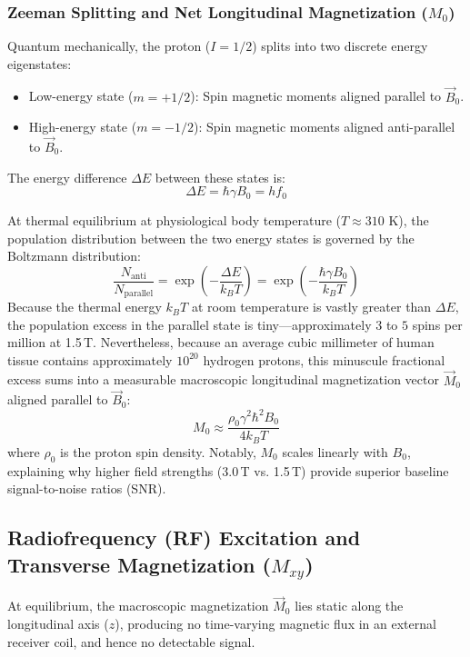 \documentclass[11pt,a4paper]{article}
\begin{document}
\subsubsection{Zeeman Splitting and Net Longitudinal Magnetization ($M_0$)}
Quantum mechanically, the proton ($I = 1/2$) splits into two discrete energy eigenstates:
\begin{itemize}
    \item Low-energy state ($m = +1/2$): Spin magnetic moments aligned parallel to $\vec{B}_0$.
    \item High-energy state ($m = -1/2$): Spin magnetic moments aligned anti-parallel to $\vec{B}_0$.
\end{itemize}
The energy difference $\Delta E$ between these states is:
\begin{equation}
    \Delta E = \hbar \gamma B_0 = h f_0
\end{equation}

At thermal equilibrium at physiological body temperature ($T \approx 310\text{ K}$), the population distribution between the two energy states is governed by the Boltzmann distribution:
\begin{equation}
    \frac{N_{\text{anti}}}{N_{\text{parallel}}} = \exp\left(-\frac{\Delta E}{k_B T}\right) = \exp\left(-\frac{\hbar \gamma B_0}{k_B T}\right)
\end{equation}
Because the thermal energy $k_B T$ at room temperature is vastly greater than $\Delta E$, the population excess in the parallel state is tiny—approximately $3$ to $5$ spins per million at 1.5\,T. Nevertheless, because an average cubic millimeter of human tissue contains approximately $10^{20}$ hydrogen protons, this minuscule fractional excess sums into a measurable macroscopic longitudinal magnetization vector $\vec{M}_0$ aligned parallel to $\vec{B}_0$:
\begin{equation}
    M_0 \approx \frac{\rho_0 \gamma^2 \hbar^2 B_0}{4 k_B T}
\end{equation}
where $\rho_0$ is the proton spin density. Notably, $M_0$ scales linearly with $B_0$, explaining why higher field strengths (3.0\,T vs. 1.5\,T) provide superior baseline signal-to-noise ratios (SNR).

\subsection{Radiofrequency (RF) Excitation and Transverse Magnetization ($M_{xy}$)}
At equilibrium, the macroscopic magnetization $\vec{M}_0$ lies static along the longitudinal axis ($z$), producing no time-varying magnetic flux in an external receiver coil, and hence no detectable signal.
\end{document}
